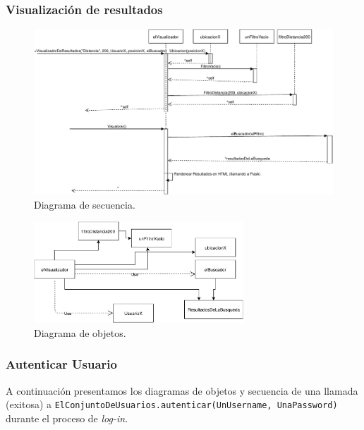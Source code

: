 \subsubsection{Visualización de resultados}

\begin{figure}[H]
  \centering
  \includegraphics[width=\textwidth]{diagramas/secuencia_4.pdf}
  \caption{\normalfont Diagrama de secuencia.}
\end{figure}

\begin{figure}[H]
  \centering
  \includegraphics[width=0.7\textwidth]{diagramas/objetos_4.pdf}
  \caption{\normalfont Diagrama de objetos.}
\end{figure}

\subsubsection{Autenticar Usuario}

\par A continuación presentamos los diagramas de objetos y secuencia de una llamada (exitosa) a 
\texttt{ElConjuntoDeUsuarios.autenticar(UnUsername, UnaPassword)} durante el proceso de \textit{log-in}.

